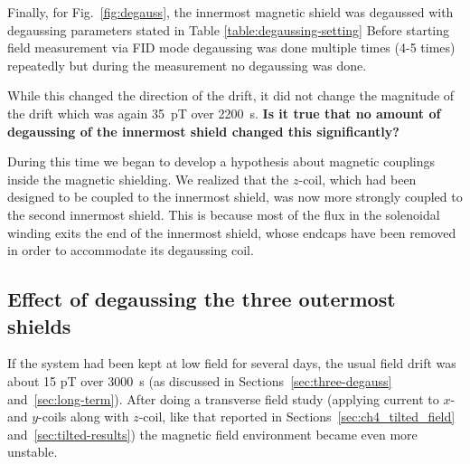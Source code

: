 Finally, for Fig.~\ref{fig:degauss}, the innermost
magnetic shield was degaussed  with degaussing parameters stated in Table \ref{table:degaussing-setting}
Before starting field measurement via FID mode degaussing was done multiple times (4-5 times) repeatedly but during the measurement no degaussing was done. 
  
  While this changed the direction of the
drift, it did not change the magnitude of the drift which was again
35~pT over 2200~s.  {\bf Is it true that no amount of degaussing of
  the innermost shield changed this significantly?}

During this time we began to develop a hypothesis about magnetic
couplings inside the magnetic shielding.  We realized that the
$z$-coil, which had been designed to be coupled to the innermost
shield, was now more strongly coupled to the second innermost shield.
This is because most of the flux in the solenoidal winding exits the
end of the innermost shield, whose endcaps have been removed in order
to accommodate its degaussing coil.


\subsection{Effect of degaussing the three outermost shields}
 
If the system had been kept at low field for several days, the usual
field drift was about 15 pT over 3000~s (as discussed in
Sections~\ref{sec:three-degauss} and~\ref{sec:long-term}).  After
doing a transverse field study (applying current to $x$- and $y$-coils
along with $z$-coil, like that reported in
Sections~\ref{sec:ch4_tilted_field} and~\ref{sec:tilted-results}) the
magnetic field environment became even more unstable.

